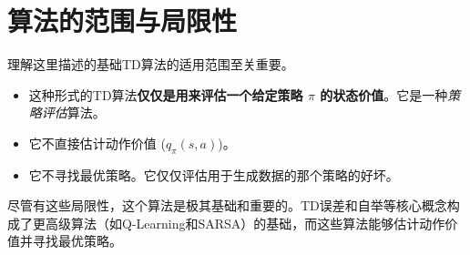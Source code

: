 \documentclass[12pt, a4paper]{article}
\begin{document}
\section{算法的范围与局限性}
理解这里描述的基础TD算法的适用范围至关重要。
\begin{itemize}
    \item 这种形式的TD算法\textbf{仅仅是用来评估一个给定策略 $\pi$ 的状态价值}。它是一种\textit{策略评估}算法。
    \item 它不直接估计动作价值 ($q_\pi(s,a)$)。
    \item 它不寻找最优策略。它仅仅评估用于生成数据的那个策略的好坏。
\end{itemize}
尽管有这些局限性，这个算法是极其基础和重要的。TD误差和自举等核心概念构成了更高级算法（如Q-Learning和SARSA）的基础，而这些算法能够估计动作价值并寻找最优策略。
\end{document}
